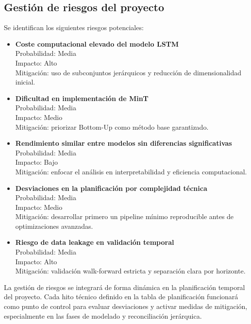 \documentclass[IB,BIB]{TFUOC}%
\begin{document}
\newpage
\subsection{Gestión de riesgos del proyecto}

Se identifican los siguientes riesgos potenciales:

\begin{itemize}
\item
  \textbf{Coste computacional elevado del modelo LSTM}\\
  Probabilidad: Media\\
  Impacto: Alto\\
  Mitigación: uso de subconjuntos jerárquicos y reducción de
  dimensionalidad inicial.
\item
  \textbf{Dificultad en implementación de MinT}\\
  Probabilidad: Media\\
  Impacto: Medio\\
  Mitigación: priorizar Bottom-Up como método base garantizado.
\item
  \textbf{Rendimiento similar entre modelos sin diferencias
  significativas}\\
  Probabilidad: Media\\
  Impacto: Bajo\\
  Mitigación: enfocar el análisis en interpretabilidad y eficiencia
  computacional.
\item
  \textbf{Desviaciones en la planificación por complejidad técnica}\\
  Probabilidad: Media\\
  Impacto: Medio\\
  Mitigación: desarrollar primero un pipeline mínimo reproducible antes
  de optimizaciones avanzadas.
\item
  \textbf{Riesgo de data leakage en validación temporal\\
  }Probabilidad: Media\\
  Impacto: Alto\\
  Mitigación: validación walk-forward estricta y separación clara por
  horizonte.
\end{itemize}

La gestión de riesgos se integrará de forma dinámica en la planificación
temporal del proyecto. Cada hito técnico definido en la tabla de
planificación funcionará como punto de control para evaluar desviaciones
y activar medidas de mitigación, especialmente en las fases de modelado
y reconciliación jerárquica.
\end{document}

